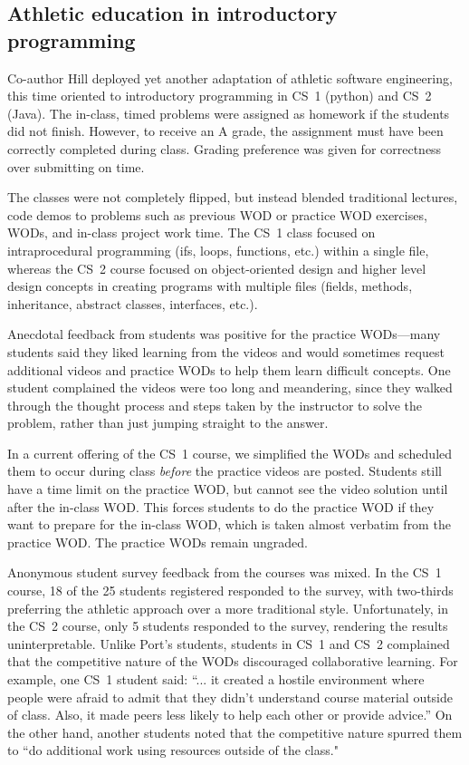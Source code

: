 \subsection{Athletic education in introductory programming}

Co-author Hill deployed yet another adaptation of athletic software engineering, this time oriented to introductory programming in CS~1 (python) and CS~2 (Java). The in-class, timed problems were assigned as homework if the students did not finish. However, to receive an A grade, the assignment must have been correctly completed during class. Grading preference was given for correctness over submitting on time.

The classes were not completely flipped, but instead blended traditional lectures, code demos to problems such as previous WOD or practice WOD exercises, WODs, and in-class project work time. The CS~1 class focused on intraprocedural programming (ifs, loops, functions, etc.) within a single file, whereas the CS~2 course focused on object-oriented design and higher level design concepts in creating programs with multiple files (fields, methods, inheritance, abstract classes, interfaces, etc.).

Anecdotal feedback from students was positive for the practice WODs---many students said they liked learning from the videos and would sometimes request additional videos and practice WODs to help them learn difficult concepts. One student complained the videos were too long and meandering, since they walked through the thought process and steps taken by the instructor to solve the problem, rather than just jumping straight to the answer.

In a current offering of the CS~1 course, we simplified the WODs and scheduled them to occur during class \emph{before} the practice videos are posted. Students still have a time limit on the practice WOD, but cannot see the video solution until after the in-class WOD. This forces students to do the practice WOD if they want to prepare for the in-class WOD, which is taken almost verbatim from the practice WOD. The practice WODs remain ungraded.

Anonymous student survey feedback from the courses was mixed. In the CS~1 course, 18 of the 25 students registered responded to the survey, with two-thirds preferring the athletic approach over a more traditional style. Unfortunately, in the CS~2 course, only 5 students responded to the survey, rendering the results uninterpretable.  Unlike Port's students, students in CS~1 and CS~2 complained that the competitive nature of the WODs discouraged collaborative learning. For example, one CS~1 student said: ``... it created a hostile environment where people were afraid to admit that they didn't understand course material outside of class. Also, it made peers less likely to help each other or provide advice.''  On the other hand, another students noted that the competitive nature spurred them to ``do additional work using resources outside of the class."

